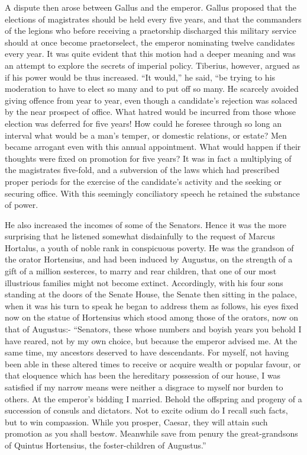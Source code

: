 
A dispute then arose between Gallus and the emperor. Gallus proposed that the elections of magistrates should be held every five years, and that the commanders of the legions who before receiving a praetorship discharged this military service should at once become praetorselect, the emperor nominating twelve candidates every year. It was quite evident that this motion had a deeper meaning and was an attempt to explore the secrets of imperial policy. Tiberius, however, argued as if his power would be thus increased. ``It would,'' he said, ``be trying to his moderation to have to elect so many and to put off so many. He scarcely avoided giving offence from year to year, even though a candidate's rejection was solaced by the near prospect of office. What hatred would be incurred from those whose election was deferred for five years! How could he foresee through so long an interval what would be a man's temper, or domestic relations, or estate? Men became arrogant even with this annual appointment. What would happen if their thoughts were fixed on promotion for five years? It was in fact a multiplying of the magistrates five-fold, and a subversion of the laws which had prescribed proper periods for the exercise of the candidate's activity and the seeking or securing office. With this seemingly conciliatory speech he retained the substance of power.


He also increased the incomes of some of the Senators. Hence it was the more surprising that he listened somewhat disdainfully to the request of Marcus Hortalus, a youth of noble rank in conspicuous poverty. He was the grandson of the orator Hortensius, and had been induced by Augustus, on the strength of a gift of a million sesterces, to marry and rear children, that one of our most illustrious families might not become extinct. Accordingly, with his four sons standing at the doors of the Senate House, the Senate then sitting in the palace, when it was his turn to speak he began to address them as follows, his eyes fixed now on the statue of Hortensius which stood among those of the orators, now on that of Augustus:- ``Senators, these whose numbers and boyish years you behold I have reared, not by my own choice, but because the emperor advised me. At the same time, my ancestors deserved to have descendants. For myself, not having been able in these altered times to receive or acquire wealth or popular favour, or that eloquence which has been the hereditary possession of our house, I was satisfied if my narrow means were neither a disgrace to myself nor burden to others. At the emperor's bidding I married. Behold the offspring and progeny of a succession of consuls and dictators. Not to excite odium do I recall such facts, but to win compassion. While you prosper, Caesar, they will attain such promotion as you shall bestow. Meanwhile save from penury the great-grandsons of Quintus Hortensius, the foster-children of Augustus.''


